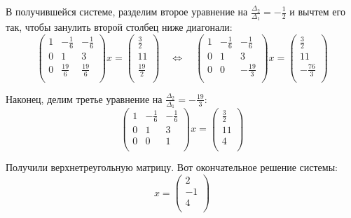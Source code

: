 \documentclass{article}
\begin{document}
\begin{example}
	В получившейся системе, разделим второе уравнение на
	$\frac{\Delta_2}{\Delta_1}=-\frac{1}{2}$ и вычтем его так, чтобы
	занулить второй столбец ниже диагонали:
	\[
		\begin{pmatrix}
			1	&-\frac{1}{6}	& -\frac{1}{6}	\\
			0	& 1	& 3	\\
			0	& \frac{19}{6}	& \frac{19}{6}	\\
		\end{pmatrix}
		x=
		\begin{pmatrix}
			\frac{3}{2} \\
			11 \\
			\frac{19}{2} \\
		\end{pmatrix}
		\quad\Leftrightarrow\quad
		\begin{pmatrix}
			1	&-\frac{1}{6}	& -\frac{1}{6}	\\
			0	& 1	& 3	\\
			0	& 0	& -\frac{19}{3}	\\
		\end{pmatrix}
		x=
		\begin{pmatrix}
			\frac{3}{2} \\
			11 \\
			-\frac{76}{3} \\
		\end{pmatrix}
	\]

	Наконец, делим третье уравнение на $\frac{\Delta_2}{\Delta_1}=
	-\frac{19}{3}$:
	\[
		\begin{pmatrix}
			1	&-\frac{1}{6}	& -\frac{1}{6}	\\
			0	& 1	& 3	\\
			0	& 0	& 1	\\
		\end{pmatrix}
		x=
		\begin{pmatrix}
			\frac{3}{2} \\
			11 \\
			4 \\
		\end{pmatrix}
	\]

	Получили верхнетреугольную матрицу. Вот окончательное решение системы:
	\[
		x=
		\begin{pmatrix}
			2 \\
			-1 \\
			4 \\
		\end{pmatrix}
	\]
\end{example}
\end{document}
